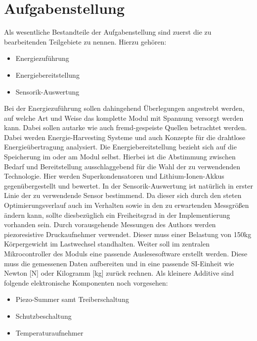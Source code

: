 \documentclass[12pt]{scrreprt} %
\begin{document}
\section{Aufgabenstellung}
Als wesentliche Bestandteile der Aufgabenstellung sind zuerst die zu bearbeitenden Teilgebiete zu nennen. Hierzu gehören:
\begin{itemize}
\item
Energiezuführung
\item
Energiebereitstellung
\item
Sensorik-Auswertung
\end{itemize}
Bei der Energiezuführung sollen dahingehend Überlegungen angestrebt werden, auf welche Art und Weise das komplette Modul mit Spannung versorgt werden kann. Dabei sollen autarke wie auch fremd-gespeiste Quellen betrachtet werden. Dabei werden Energie-Harvesting Systeme und auch Konzepte für die drahtlose Energieübertragung analysiert. Die Energiebereitstellung bezieht sich auf die Speicherung im oder am Modul selbst. Hierbei ist die Abstimmung zwischen Bedarf und Bereitstellung ausschlaggebend für die Wahl der zu verwendenden Technologie. Hier werden Superkondensatoren und Lithium-Ionen-Akkus gegenübergestellt und bewertet. In der Sensorik-Auswertung ist natürlich in erster Linie der zu verwendende Sensor bestimmend. Da dieser sich durch den steten Optimierungsverlauf auch im Verhalten sowie in den zu erwartenden Messgrößen ändern kann, sollte diesbezüglich ein Freiheitsgrad in der Implementierung vorhanden sein. Durch vorausgehende Messungen des Authors werden piezoresistive Druckaufnehmer verwendet. Dieser muss einer Belastung von 150kg Körpergewicht im Lastwechsel standhalten. Weiter soll im zentralen Mikrocontroller des Moduls eine passende Auslesesoftware erstellt werden. Diese muss die gemessenen Daten aufbereiten und in eine passende SI-Einheit wie Newton [N] oder Kilogramm [kg] zurück rechnen. Als kleinere Additive sind folgende elektronische Komponenten noch vorgesehen: 
\begin{itemize}
\item
Piezo-Summer samt Treiberschaltung
\item
Schutzbeschaltung
\item
Temperaturaufnehmer
\end{itemize}
\end{document}
